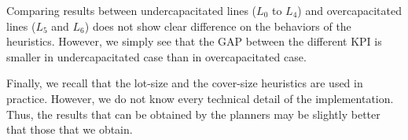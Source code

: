 Comparing results between undercapacitated lines ($L_0$ to $L_4$) and overcapacitated lines ($L_5$ and $L_6$) does not show clear difference on the behaviors of the heuristics.
However, we simply see that the GAP between the different KPI is smaller in undercapacitated case than in overcapacitated case.


Finally, we recall that the lot-size and the cover-size heuristics are used in practice.
However, we do not know every technical detail of the implementation.
Thus, the results that can be obtained by the planners may be slightly better that those that we obtain.








